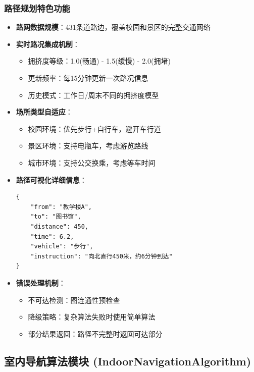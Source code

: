 \documentclass[12pt,a4paper]{article}
\begin{document}
\subsubsection{路径规划特色功能}
\begin{itemize}
    \item \textbf{路网数据规模}：431条道路边，覆盖校园和景区的完整交通网络
    \item \textbf{实时路况集成机制}：
    \begin{itemize}
        \item 拥挤度等级：1.0(畅通) - 1.5(缓慢) - 2.0(拥堵)
        \item 更新频率：每15分钟更新一次路况信息
        \item 历史模式：工作日/周末不同的拥挤度模型
    \end{itemize}
    \item \textbf{场所类型自适应}：
    \begin{itemize}
        \item 校园环境：优先步行+自行车，避开车行道
        \item 景区环境：支持电瓶车，考虑游览路线
        \item 城市环境：支持公交换乘，考虑等车时间
    \end{itemize}
    \item \textbf{路径可视化详细信息}：
    \begin{verbatim}
{
    "from": "教学楼A",
    "to": "图书馆", 
    "distance": 450,
    "time": 6.2,
    "vehicle": "步行",
    "instruction": "向北直行450米，约6分钟到达"
}
    \end{verbatim}
    \item \textbf{错误处理机制}：
    \begin{itemize}
        \item 不可达检测：图连通性预检查
        \item 降级策略：复杂算法失败时使用简单算法
        \item 部分结果返回：路径不完整时返回可达部分
    \end{itemize}
\end{itemize}

\subsection{室内导航算法模块 (IndoorNavigationAlgorithm)}
\end{document}
